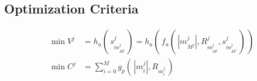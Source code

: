 \subsection{Optimization Criteria}\label{subsec:optimization-criteria}
\begin{align*}
    \min V^{j} &= h_{a}(\, s_{m_{M^{j}}^{j}}^{j} \,) = h_{a}(\, f_{a}(\, |m_{M^{j}}^{j}|, R_{m_{M^{j}}^{j}}^{j}, s_{m_{M^{j}}^{j}}^{j}\,) \,)\\
    \min C^{j} &= \sum_{i = 0}^{M} g_{p} (\, |m_{i}^{j}|, R_{m_{i}^{j}} \,)
\end{align*}











































